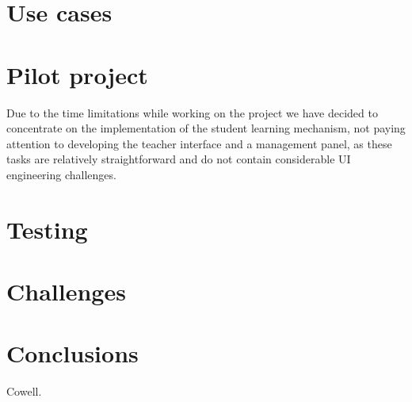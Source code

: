 \documentclass[a4paper]{article}
\begin{document}
\section{Use cases}

\section{Pilot project}

Due to the time limitations while working on the project we have decided to concentrate on the implementation of the student learning mechanism, not paying attention to developing the teacher interface and a management panel, as these tasks are relatively straightforward and do not contain considerable UI engineering challenges.

\section{Testing}

\section{Challenges}


\section{Conclusions}

\begin{thebibliography}{99}
 Cowell.
\end{thebibliography}
\end{document}
